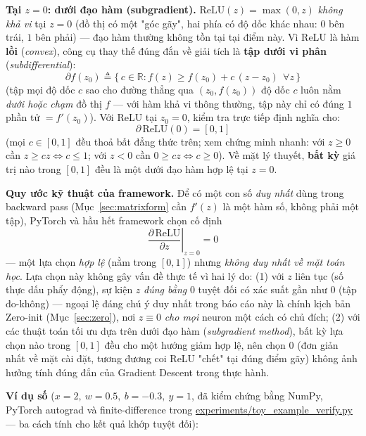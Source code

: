 \documentclass[12pt,a4paper]{report}
\newcommand{\en}[1]{\textit{#1}}
\begin{document}
\textbf{Tại $z=0$: dưới đạo hàm (subgradient).} $\mathrm{ReLU}(z)=\max(0,z)$
\emph{không khả vi} tại $z=0$ (đồ thị có một "góc gãy", hai phía có độ dốc
khác nhau: $0$ bên trái, $1$ bên phải) --- đạo hàm thường không tồn tại tại
điểm này. Vì ReLU là hàm \textbf{lồi} (\en{convex}), công cụ thay thế đúng
đắn về giải tích là \textbf{tập dưới vi phân} (\en{subdifferential}):
$$\partial f(z_0) \triangleq \{\,c\in\mathbb R : f(z) \ge f(z_0) + c\,(z-z_0)\ \ \forall z\,\}$$
(tập mọi độ dốc $c$ sao cho đường thẳng qua $(z_0,f(z_0))$ độ dốc $c$ luôn
nằm \emph{dưới hoặc chạm} đồ thị $f$ --- với hàm khả vi thông thường, tập
này chỉ có đúng $1$ phần tử $=f'(z_0)$). Với $\mathrm{ReLU}$ tại $z_0=0$,
kiểm tra trực tiếp định nghĩa cho:
$$\partial\,\mathrm{ReLU}(0) = [0,1]$$
(mọi $c\in[0,1]$ đều thoả bất đẳng thức trên; xem chứng minh nhanh:
với $z\ge0$ cần $z\ge cz\Leftrightarrow c\le1$; với $z<0$ cần $0\ge cz
\Leftrightarrow c\ge0$). Về mặt lý thuyết, \textbf{bất kỳ} giá trị nào
trong $[0,1]$ đều là một dưới đạo hàm hợp lệ tại $z=0$.

\textbf{Quy ước kỹ thuật của framework.} Để có một con số \emph{duy nhất}
dùng trong backward pass (Mục~\ref{sec:matrixform} cần $f'(z)$ là một hàm
số, không phải một tập), PyTorch và hầu hết framework chọn cố định
$$\left.\frac{\partial\,\mathrm{ReLU}}{\partial z}\right\vert_{z=0} = 0$$
--- một lựa chọn \emph{hợp lệ} (nằm trong $[0,1]$) nhưng \emph{không duy
nhất về mặt toán học}. Lựa chọn này không gây vấn đề thực tế vì hai lý do:
(1) với $z$ liên tục (số thực dấu phẩy động), sự kiện $z$ \emph{đúng bằng}
$0$ tuyệt đối có xác suất gần như $0$ (tập đo-không) --- ngoại lệ đáng chú
ý duy nhất trong báo cáo này là chính kịch bản Zero-init
(Mục~\ref{sec:zero}), nơi $z\equiv0$ \emph{cho mọi} neuron một cách có chủ
đích; (2) với các thuật toán tối ưu dựa trên dưới đạo hàm
(\en{subgradient method}), bất kỳ lựa chọn nào trong $[0,1]$ đều cho một
hướng giảm hợp lệ, nên chọn $0$ (đơn giản nhất về mặt cài đặt, tương
đương coi ReLU "chết" tại đúng điểm gãy) không ảnh hưởng tính đúng đắn
của Gradient Descent trong thực hành.

\textbf{Ví dụ số} ($x=2,\ w=0.5,\ b=-0.3,\ y=1$, đã kiểm chứng bằng
NumPy, PyTorch autograd và finite-difference trong
\url{experiments/toy_example_verify.py} --- ba cách tính cho kết quả
khớp tuyệt đối):
\end{document}
